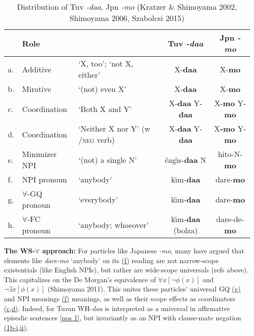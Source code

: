 \documentclass[11pt]{article}
\newcommand{\changis}{\v{c}a\textipa{N}g\"{\i}s}
\begin{document}
\vspace{-10pt}
\begin{table}[H]
    \centering
     \caption{Distribution of Tuv \textit{-daa}, Jpn \textit{-mo} (Kratzer \& Shimoyama 2002, Shimoyama 2006, Szabolcsi 2015)}
    \begin{tabular}{lllcc}
        \hline & \multicolumn{2}{l}{Role}& Tuv \textit{-daa} & Jpn \textit{-mo}\\\hline 
    a. & Additive &  `X, too'; `not X, either'   & X-\textbf{daa} & X-\textbf{mo} \\
    b. & Mirative &  `(not) even X'  & X-\textbf{daa} & X-\textbf{mo}\\\hline 
    c. & Coordination & `Both X and Y'  & X-\textbf{daa} Y-\textbf{daa} & X-\textbf{mo} Y-\textbf{mo}\\
    d. & Coordination & `Neither X nor Y' (w /\textsc{neg} verb)  & X-\textbf{daa} Y-\textbf{daa} & X\textbf{-mo} Y-\textbf{mo} \\\hline 
    e. & Minimizer NPI & `(not) a single N'  & \changis-\textbf{daa} N & hito-N-\textbf{mo} \\ 
    f. & NPI pronoun & `anybody'  & k\"{\i}m-\textbf{daa} & dare-\textbf{mo}\\
    g. & $\forall$-GQ pronoun & `everybody'  & k\"{\i}m-\textbf{daa} & dare-\textbf{mo}\\
    h. & $\forall$-FC pronoun & `anybody; whoeover' & k\"{\i}m-\textbf{daa} (bolza) & dare-de-\textbf{mo}\\\hline 
    \end{tabular}
    \label{distribution table}
\end{table}
\vspace{-10pt}



\noindent \textbf{The WS-$\forall$ approach: }For particles like Japanese \textit{-mo}, many have argued that elements like \textit{dare-mo} `anybody' on its \hyperref[distribution table]{(f)} reading are not narrow-scope existentials (like English NPIs), but rather are wide-scope universals (refs above).  This capitalizes on the De Morgan's equivalence of $\forall x[\neg \phi(x)]$ and $\neg \exists x[\phi(x)]$ (Shimoyama 2011).  This unites these particles' universal GQ \hyperref[distribution table]{(g)} and NPI meanings \hyperref[distribution table]{(f)} meanings, as well as their scope effects as coordinators \hyperref[distribution table]{(c,d)}.  Indeed, for Tuvan WH-\textit{daa} is interpreted as a universal in affirmative episodic sentences \ref{pos 1}, but invariantly as an NPI with clause-mate negation \hyperref[neg 1]{(1b-i,ii)}.
\end{document}
